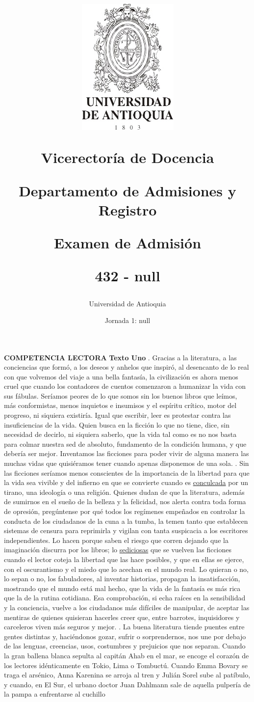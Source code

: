 \documentclass[a4paper,12pt]{article}
\title{ 
\begin{minipage}{12cm} 
\centerline {\includegraphics{../../escudo.jpg}} 
\begin{center}Vicerector\'ia de Docencia\end{center}Departamento de Admisiones y Registro\newline\newline\newline\newline\centerline {Examen de Admisi\'on}\newline\newline\centerline {432 - null}\author{Universidad de Antioquia}\date{Jornada 1:  null}\end{minipage}}
\begin{document}
\maketitle
\twocolumn 
\newpage \textbf{ COMPETENCIA LECTORA } \newline \textbf{ Texto Uno} . Gracias a la literatura, a las conciencias que formó, a los deseos y anhelos que inspiró, al desencanto de lo real con que volvemos del viaje a una bella fantasía, la civilización es ahora menos cruel que cuando los contadores de cuentos comenzaron a humanizar la vida con sus fábulas. Seríamos peores de lo que somos sin los buenos libros que leímos, más conformistas, menos inquietos e insumisos y el espíritu crítico, motor del progreso, ni siquiera existiría. Igual que escribir, leer es protestar contra las insuficiencias de la vida. Quien busca en la ficción lo que no tiene, dice, sin necesidad de decirlo, ni siquiera saberlo, que la vida tal como es no nos basta para colmar nuestra sed de absoluto, fundamento de la condición humana, y que debería ser mejor. Inventamos las ficciones para poder vivir de alguna manera las muchas vidas que quisiéramos tener cuando apenas disponemos de una sola. . Sin las ficciones seríamos menos conscientes de la importancia de la libertad para que la vida sea vivible y del infierno en que se convierte cuando es \underline{ conculcada}  por un tirano, una ideología o una religión. Quienes dudan de que la literatura, además de sumirnos en el sueño de la belleza y la felicidad, nos alerta contra toda forma de opresión, pregúntense por qué todos los regímenes empeñados en controlar la conducta de los ciudadanos de la cuna a la tumba, la temen tanto que establecen sistemas de censura para reprimirla y vigilan con tanta suspicacia a los escritores independientes. Lo hacen porque saben el riesgo que corren dejando que la imaginación discurra por los libros; lo \underline{ sediciosas}  que se vuelven las ficciones cuando el lector coteja la libertad que las hace posibles, y que en ellas se ejerce, con el oscurantismo y el miedo que lo acechan en el mundo real. Lo quieran o no, lo sepan o no, los fabuladores, al inventar historias, propagan la insatisfacción, mostrando que el mundo está mal hecho, que la vida de la fantasía es más rica que la de la rutina cotidiana. Esa comprobación, si echa raíces en la sensibilidad y la conciencia, vuelve a los ciudadanos más difíciles de manipular, de aceptar las mentiras de quienes quisieran hacerles creer que, entre barrotes, inquisidores y carceleros viven más seguros y mejor. . La buena literatura tiende puentes entre gentes distintas y, haciéndonos gozar, sufrir o sorprendernos, nos une por debajo de las lenguas, creencias, usos, costumbres y prejuicios que nos separan. Cuando la gran ballena blanca sepulta al capitán Ahab en el mar, se encoge el corazón de los lectores idénticamente en Tokio, Lima o Tombuctú. Cuando Emma Bovary se traga el arsénico, Anna Karenina se arroja al tren y Julián Sorel sube al patíbulo, y cuando, en El Sur, el urbano doctor Juan Dahlmann sale de aquella pulpería de la pampa a enfrentarse al cuchillo 
\end{document}
